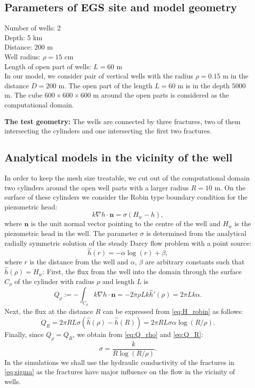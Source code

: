 \documentclass{article}
\newcommand{\eq}[1]{\begin{equation}#1\end{equation}}
\newcommand{\nn}{\vc n}
\newcommand{\vc}[1]{\boldsymbol{#1}}
\begin{document}
\subsection{Parameters of EGS site and model geometry}

Number of wells: 2 \\
Depth: 5 km \\
Distance: 200 m \\
Well radius: $\rho = 15$ cm \\
Length of open part of wells: $L=60$ m \\



In our model, we consider pair of vertical wells with the radius $\rho=0.15$ m in the distance $D=200$ m. The open part of the length $L=60$ m is in the depth $5000$ m. The cube $600 \times 600 \times 600$ m around the open parts is considered as the computational domain.

{\bf The test geometry:} The wells are connected by three fractures, two of them intersecting the cylinders and one intersecting the first two fractures.

\subsection{Analytical models in the vicinity of the well}
In order to keep the mesh size treatable, we cut out of the computational domain two cylinders around the open well parts with a larger radius $R=10$ m.
On the surface of these cylinders we consider the Robin type boundary condition for the piezometric head:
%
\eq{\label{eq:H_robin} k\nabla h\cdot\nn = \sigma(H_w-h), }
%
where $\nn$ is the unit normal vector pointing to the centre of the well and $H_w$ is the piezometric head in the well.
The parameter $\sigma$ is determined from the analytical radially symmetric solution
of the steady Darcy flow problem with a point source:
\[
    \hat h(r) = -\alpha \log (r) + \beta,
\]
where $r$ is the distance from the well and $\alpha$, $\beta$ are arbitrary constants such that $\hat h(\rho)=H_w$:
First, the flux from the well into the domain through the surface $C_\rho$ of the cylinder with radius $\rho$ and length $L$ is
%  
\eq{\label{eq:Q_rho}    Q_\rho := -\int_{C_\rho} k\nabla h\cdot\nn = -2\pi \rho L k \hat h'(\rho) = 2\pi L k \alpha. }
%
Next, the flux at the distance $R$ can be expressed from \eqref{eq:H_robin} as follows:
%
\eq{\label{eq:Q_R}   Q_R = 2\pi R L \sigma (\hat h(\rho) - \hat h(R)) = 2\pi R L \sigma \alpha \log(R/\rho).}
%
Finally, since $Q_\rho=Q_R$, we obtain from \eqref{eq:Q_rho} and \eqref{eq:Q_R}:
\eq{ \label{eq:sigma} \sigma = \frac{k}{R\log(R/\rho)}. }
In the simulations we shall use the hydraulic conductivity of the fractures in \eqref{eq:sigma} as the fractures have major influence on the flow in the vicinity of wells.
\end{document}
